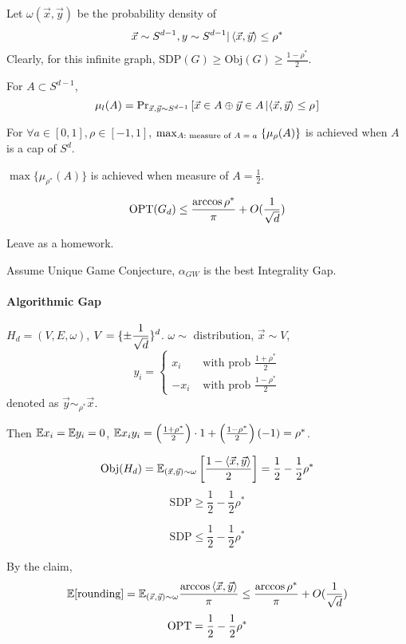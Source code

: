 Let  $ \omega(\vec{x},\vec{y}) $ be the probability density of 
\[\vec{x}\sim S^{d-1},y\sim S^{d-1}|\left<\vec{x},\vec{y}\right> \leq \rho^*\]
Clearly, for this infinite graph,  $ \mathrm{SDP}(G) \geq \mathrm{Obj}(G) \geq \frac{1-\rho^*}{2} $. 

For  $ A\subset S^{d-1}$, 
\[\mu_l(A)=\mathrm{Pr}_{\vec{x},\vec{y}\sim S^{d-1}}\left[\vec{x}\in A\oplus \vec{y}\in A\left|\left<\vec{x},\vec{y}\right> \leq \rho\right.\right]\] 
\begin{theorem}
    For  $ \forall a\in [0,1],\rho\in [-1,1] $,  $ \max_{A:\text{ measure of  $ A=a $ }}\{\mu_{\rho}(A)\} $ is achieved when  $ A  $ is a cap of  $ S^d $.   
\end{theorem}
\begin{corollary}
     $ \max\{\mu_{\rho^*}(A)\} $ is achieved when measure of  $ A=\frac{1}{2} $.   
\end{corollary}
\begin{claim}
    \[\mathrm{OPT}(G_d) \leq \frac{\arccos \rho^*}{\pi}+O(\frac{1}{\sqrt{d}}) \]
\end{claim}
Leave as a homework.

Assume Unique Game Conjecture,  $ \alpha_{GW} $ is the best Integrality Gap.

\paragraph{Algorithmic Gap}
\begin{example}[Instance]
    $ H_d=(V,E,\omega) $,  $ \displaystyle V=\{\pm\frac{1}{\sqrt{d}}\}^d $.  $ \omega\sim  $ distribution,  $ \vec{x}\sim V $, 
    \begin{equation}
        y_i=\begin{cases}
            x_i&\text{ with prob } \frac{1+\rho^*}{2}\\
            -x_i&\text{ with prob } \frac{1-\rho^*}{2}
        \end{cases}\label{def: sim_rho}
    \end{equation}
    denoted as  $ \vec{y}\sim_{\rho^*}\vec{x} $.
    
    Then  $ \mathbb E x_i=\mathbb E y_i=0 $,  $ \mathbb E x_iy_i=\left(\frac{1+\rho^*}{2}\right)\cdot 1+\left(\frac{1-\rho^*}{2}\right)(-1)=\rho^* $.
\end{example}

\begin{fact}
    \[ \mathrm{Obj}(H_d)=\mathbb E_{(\vec{x},\vec{y})\sim \omega}\left[\frac{1-\left<\vec{x},\vec{y}\right>}{2}\right]=\frac{1}{2}-\frac{1}{2}\rho^* \]
    \[\mathrm{SDP} \geq \frac{1}{2}-\frac{1}{2}\rho^*\]
\end{fact}
\begin{claim}\label{claim: sdp_gap}
    \[\mathrm{SDP} \leq \frac{1}{2}-\frac{1}{2}\rho^*\]
\end{claim}
By the claim, 
\[\mathbb E[\text{rounding}]=\mathbb E_{(\vec{x},\vec{y})\sim \omega}\frac{\arccos\left<\vec{x},\vec{y}\right>}{\pi} \leq \frac{\arccos\rho^*}{\pi}+O(\frac{1}{\sqrt{d}})\]
\[\mathrm{OPT}=\frac{1}{2}-\frac{1}{2}\rho^*\]

